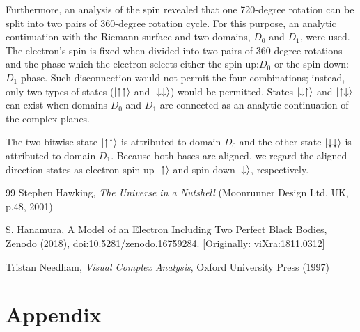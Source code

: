\documentclass[reprint,amsmath,amssymb,aps,]{revtex4-1}
\numberwithin{equation}{section}%
\begin{document}
    Furthermore, an analysis of the spin revealed that one 720-degree rotation can be split into two pairs of 360-degree rotation cycle. For this purpose, an analytic continuation with the Riemann surface and two domains, $D_{0}$ and $D_{1}$, were used. The electron's spin is fixed when divided into two pairs of 360-degree rotations and the phase which the electron selects either the spin up:$D_{0}$ or the spin down:$D_{1}$ phase. Such disconnection would not permit the four combinations; instead, only two types of states ($\ket{\uparrow \uparrow}$ and $\ket{\downarrow \downarrow}$) would be permitted. States $\ket{\downarrow \uparrow}$ and $\ket{\uparrow \downarrow}$ can exist when domains $D_{0}$ and $D_{1}$ are connected as an analytic continuation of the complex planes.
    
    The two-bitwise state $\ket{\uparrow \uparrow}$ is attributed to domain $D_{0}$ and the other state $\ket{\downarrow \downarrow}$ is attributed to domain $D_{1}$. Because both bases are aligned, we regard the aligned direction states as electron spin up $\ket{\uparrow}$ and spin down $\ket{\downarrow}$, respectively. 


\begin{thebibliography}{99}
 Stephen Hawking, \textit{The Universe in a Nutshell} (Moonrunner Design Ltd. UK, p.48, 2001)

 S. Hanamura, A Model of an Electron Including Two Perfect Black Bodies, Zenodo (2018), \href{https://doi.org/10.5281/zenodo.16759284}{doi:10.5281/zenodo.16759284}. [Originally: \href{http://vixra.org/abs/1811.0312}{viXra:1811.0312}]

 Tristan Needham, \textit{Visual Complex Analysis}, Oxford University Press (1997)

\end{thebibliography}


\clearpage
\section{Appendix}
\label{Appendix}

\end{document}

